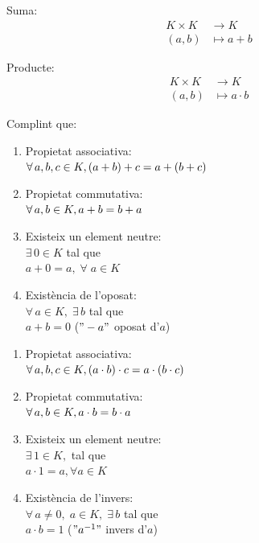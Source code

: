 \documentclass[a4paper, 11pt]{article}
\begin{document}
\begin{multicols}{2}
	Suma: 
\begin{align*}
	K \times K & \longrightarrow K \\
	\left( a, b \right) & \longmapsto a+b
\end{align*}

\columnbreak

Producte: 
\begin{align*}
	K \times K & \longrightarrow K \\
	\left( a, b \right) & \longmapsto a \cdot b
\end{align*}

\end{multicols}
Complint que:
\begin{multicols}{2}
\begin{enumerate}[$\bullet$]
	\item Propietat associativa: \\
	$\forall \, a, b, c \in K, \\
	(a+b)+c=a+(b+c)$
	\item Propietat commutativa: \\
	$\forall \, a, b \in K, \\
	a+b=b+a$
	\item Existeix un element neutre: \\
	$\exists \, 0 \in K $ tal que \\
	$a+0=a, \; \forall \; a \in K$
	\item Existència de l'oposat: \\
	$\forall \, a \in K, \; \exists \, b$ tal que \\
	$a+b=0$ ($"-a"$ oposat d'$a$)
\end{enumerate}
\columnbreak
\begin{enumerate}[$\bullet$]
	\item Propietat associativa: \\
	$\forall \, a, b, c \in K, \\
	(a \cdot b) \cdot c=a \cdot (b \cdot c)$
	\item Propietat commutativa: \\
	$\forall \, a, b \in K, \\
	a \cdot b=b \cdot a$
	\item Existeix un element neutre: \\
	$\exists \, 1 \in K,$ tal que \\
	$a \cdot 1=a, \forall a \in K$
	\item Existència de l'invers: \\
	$\forall \, a \not= 0, \; a \in K, \; \exists \, b$ tal que \\
	$a \cdot b=1$ ($"a^{-1}"$  invers d'$a$)
\end{enumerate}
\end{multicols}
\end{document}
